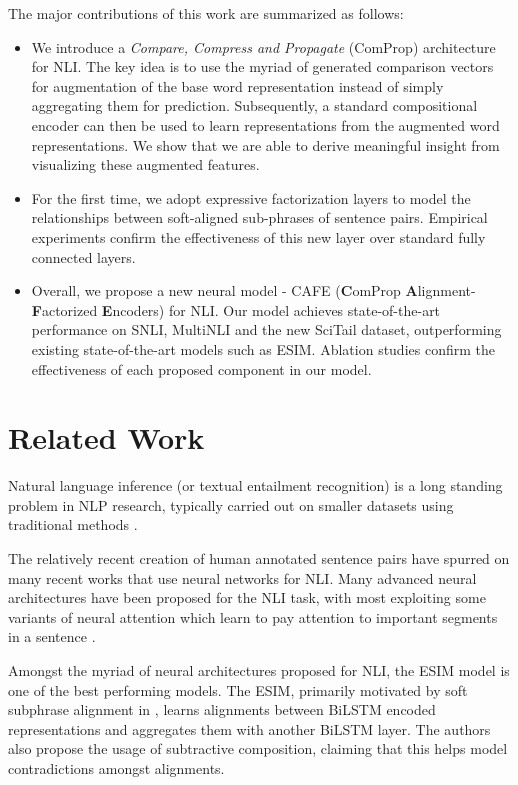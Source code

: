 \documentclass[11pt,a4paper]{article}
\begin{document}
The major contributions of this work are summarized as follows:
\begin{itemize}
\item We introduce a \textit{Compare, Compress and Propagate} (ComProp) architecture for NLI. The key idea is to use the myriad of generated comparison vectors for augmentation of the base word representation instead of simply aggregating them for prediction. Subsequently, a standard compositional encoder can then be used to learn representations from the augmented word representations. We show that we are able to derive meaningful insight from visualizing these augmented features.
\item For the first time, we adopt expressive factorization layers to model the relationships between soft-aligned sub-phrases of sentence pairs. Empirical experiments confirm the effectiveness of this new layer over standard fully connected layers.
\item Overall, we propose a new neural model - \textsc{CAFE} (\textbf{C}omProp \textbf{A}lignment-\textbf{F}actorized \textbf{E}ncoders) for NLI. Our model achieves state-of-the-art performance on SNLI, MultiNLI and the new SciTail dataset, outperforming existing state-of-the-art models such as ESIM. Ablation studies confirm the effectiveness of each proposed component in our model.
\end{itemize}

\section{Related Work}

Natural language inference (or textual entailment recognition) is a long standing problem in NLP research, typically carried out on smaller datasets using
traditional methods \cite{Maccartney:2009:NLI:1751277,Dagan:2005:PRT:2100045.2100054,MacCartney:2008:MSC:1599081.1599147,Iftene:2007:HTS:1654536.1654562}.

The relatively recent creation of  human annotated sentence pairs \cite{DBLP:conf/emnlp/BowmanAPM15} have spurred on many recent works that use neural networks for NLI. Many advanced neural architectures have been proposed for the NLI task, with most exploiting some variants of neural attention which learn to pay attention to important segments in a sentence \cite{DBLP:conf/emnlp/ParikhT0U16,DBLP:conf/acl/ChenZLWJI17,DBLP:conf/naacl/WangJ16,rocktaschel2015reasoning,DBLP:conf/eacl/YuM17a}.

Amongst the myriad of neural architectures proposed for NLI, the ESIM \cite{DBLP:conf/acl/ChenZLWJI17} model is one of the best performing models. The ESIM, primarily motivated by soft subphrase alignment in \cite{DBLP:conf/emnlp/ParikhT0U16}, learns alignments between BiLSTM encoded representations and aggregates them with another BiLSTM layer. The authors also propose the usage of subtractive composition, claiming that this helps model contradictions amongst alignments.
\end{document}
